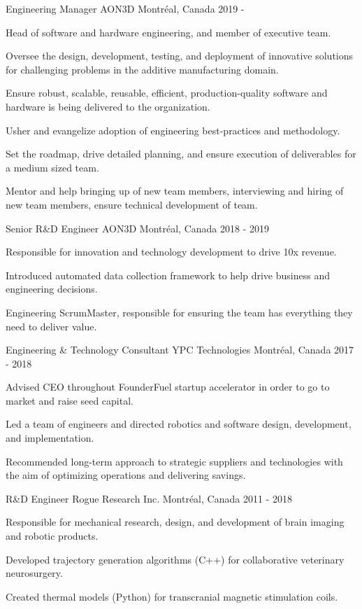 \begin{cventries}

\cventry
{Engineering Manager}
{AON3D}
{Montréal, Canada}
{2019 - }
{
\begin{cvitems} 
\item{Head of software and hardware engineering, and member of executive team.}
\item{Oversee the design, development, testing, and deployment of innovative solutions for challenging problems in the additive manufacturing domain.}
\item{Ensure robust, scalable, reusable, efficient, production-quality software and hardware is being delivered to the organization.}
\item{Usher and evangelize adoption of engineering best-practices and methodology.}
\item{Set the roadmap, drive detailed planning, and ensure execution of deliverables for a medium sized team.}
\item{Mentor and help bringing up of new team members, interviewing and hiring of new team members, ensure technical development of team.}
\end{cvitems}
}

\cventry
{Senior R\&D Engineer}
{AON3D}
{Montréal, Canada}
{2018 - 2019}
{
\begin{cvitems} 
\item{Responsible for innovation and technology development to drive 10x revenue.}
\item{Introduced automated data collection framework to help drive business and engineering decisions.}
\item{Engineering ScrumMaster, responsible for ensuring the team has everything they need to deliver value.}
\end{cvitems}
}

\cventry
{Engineering \& Technology Consultant}
{YPC Technologies}
{Montréal, Canada}
{2017 - 2018}
{
\begin{cvitems} 
\item{Advised CEO throughout FounderFuel startup accelerator in order to go to market and raise seed capital.}
\item{Led a team of engineers and directed robotics and software design, development, and implementation.}
\item{Recommended long-term approach to strategic suppliers and technologies with the aim of optimizing operations and delivering savings.}
\end{cvitems}
}

\cventry
{R\&D Engineer}
{Rogue Research Inc.}
{Montréal, Canada}
{2011 - 2018}
{
\begin{cvitems} 
\item{Responsible for mechanical research, design, and development of brain imaging and robotic products.}
\item{Developed trajectory generation algorithms (C++) for collaborative veterinary neurosurgery.}
\item{Created thermal models (Python) for transcranial magnetic stimulation coils.}
\end{cvitems}
}

\end{cventries}